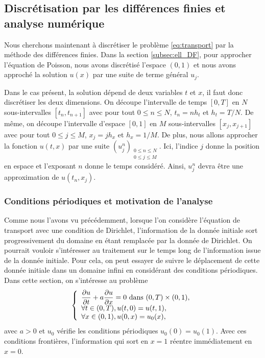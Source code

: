 \documentclass[12pt,a4paper,twoside]{article}
\begin{document}
\subsection{Discr\'etisation par les diff\'erences finies et analyse num\'erique}
\label{subsec:transport_DF}

Nous cherchons maintenant \`a discr\'etiser le probl\`eme \eqref{eq:transport}
par la m\'ethode des diff\'erences finies.
Dans la section \ref{subsec:ell_DF}, pour approcher l'\'equation de Poisson,
nous avons discr\'etis\'e l'espace $(0,1)$ et nous avons approch\'e la solution
$u(x)$ par une suite de terme g\'en\'eral $u_j$.

Dans le cas pr\'esent, la solution d\'epend de deux variables $t$ et $x$,
il faut donc discr\'etiser les deux dimensions.
On d\'ecoupe l'intervalle de temps $[0,T]$ en $N$ sous-intervalles $[t_n , t_{n+1}]$
avec pour tout $0\leq n \leq N$,  $t_n = n h_t$ et $h_t = T/N$.
De m\^eme, on d\'ecoupe l'intervalle d'espace $[0,1]$ en $M$ sous-intervalles
$[x_j , x_{j+1}]$ avec pour tout $0 \leq j \leq M$, $x_j = j h_x$ et $h_x = 1/M$. 
De plus, nous allons approcher la fonction $u(t,x)$ par une suite
$(u_j^n)_{\substack{0 \leq n \leq N \\ 0 \leq j \leq M}}$.
Ici, l'indice $j$ donne la position en espace et l'exposant $n$
donne le temps consid\'er\'e. Ainsi, $u_j^n$ devra \^etre une approximation
de $u(t_n, x_j)$.

\subsubsection{Conditions p\'eriodiques et motivation de l'analyse}

Comme nous l'avons vu pr\'ec\'edemment, lorsque l'on consid\`ere
l'\'equation de transport avec une condition de Dirichlet,
l'information de la donn\'ee initiale sort progressivement du domaine
en \'etant remplac\'ee par la donn\'ee de Dirichlet.
On pourrait vouloir s'int\'eresser au traitement sur le temps long de 
l'information issue de la donn\'ee initiale.
Pour cela, on peut essayer de suivre le d\'eplacement de cette donn\'ee
initiale dans un domaine infini en consid\'erant des conditions p\'eriodiques.
Dans cette section, on s'int\'eresse au probl\`eme
\begin{equation}
  \label{eq:transport_per}
  \left\{
    \begin{array}{l}
     \dfrac{\partial u}{\partial t} + a \dfrac{\partial u}{\partial x} = 0 
      \text{ dans } (0,T) \times (0,1),
      \\
      \forall t \in (0,T), u(t,0) = u(t,1) ,
      \\
      \forall x \in (0,1), u(0,x) = u_0(x) ,
    \end{array}
  \right.
\end{equation}
avec $a>0$ et $u_0$ v\'erifie les conditions p\'eriodiques $u_0(0) = u_0(1)$.
Avec ces conditions fronti\`eres, l'information qui sort en 
$x=1$ r\'eentre imm\'ediatement en $x=0$.
\end{document}
